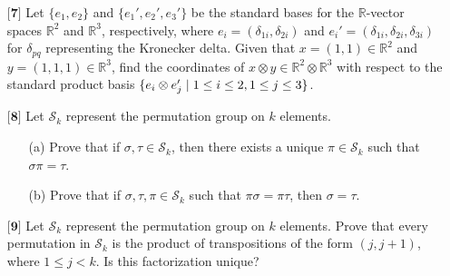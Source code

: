 \documentclass[12pt]{article}
\begin{document}
\begin{itemize}
    \vspace{.5cm}
    \item[$\textbf{[7]}$]
    Let $\{e_1,e_2\}$ and $\{e_1',e_2',e_3'\}$ be the standard bases for the $\mathbb{R}$-vector spaces $\mathbb{R}^2$ and $\mathbb{R}^3$, respectively, where \newline $e_i = (\delta_{1i},\delta_{2i})$ and $e_i' = (\delta_{1i},\delta_{2i},\delta_{3i})$ for $\delta_{pq}$ representing the Kronecker delta. Given that $x = (1,1) \in \mathbb{R}^2$ and $y = (1,1,1) \in \mathbb{R}^3$, find the coordinates of $x \otimes y \in \mathbb{R}^2 \otimes \mathbb{R}^3$ with respect to the standard product basis $\{e_i \otimes e_j' \hspace{.1cm} | \hspace{.1cm} 1 \leq i \leq 2, 1 \leq j \leq 3\}$. 
    
    \vspace{.5cm}
    \item[$\textbf{[8]}$]
    Let $\mathcal{S}_k$ represent the permutation group on $k$ elements. 
    \begin{itemize}
    
    \vspace{.3cm}
    \item[(a)]
    Prove that if $\sigma,\tau \in \mathcal{S}_k$, then there exists a unique $\pi \in \mathcal{S}_k$ such that $\sigma\pi = \tau$. 
    
    \vspace{.3cm}
    \item[(b)]
    Prove that if $\sigma,\tau,\pi \in \mathcal{S}_k$ such that $\pi\sigma = \pi\tau$, then $\sigma = \tau$. 
    
    \end{itemize}
    
    \vspace{.5cm}
    \item[$\textbf{[9]}$]
    Let $\mathcal{S}_k$ represent the permutation group on $k$ elements. Prove that every permutation in $\mathcal{S}_k$ is the product of transpositions of the form $(j,j+1)$, where $1 \leq j < k$. Is this factorization unique?
    

\end{itemize}
\end{document}
